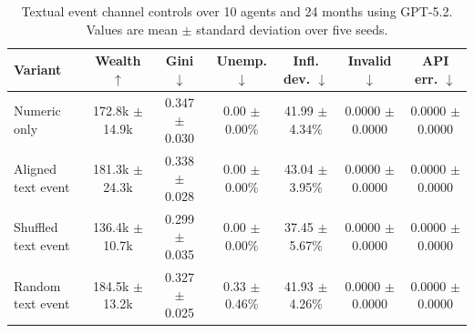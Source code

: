 \ifdefined\FinEvoAllowHistoricalPrePZeroEvidence\else
{}
\fi
\begin{table}[t]
\centering
\small
\setlength{\tabcolsep}{4pt}
\begin{tabular}{lcccccc}
\toprule
Variant & Wealth $\uparrow$ & Gini $\downarrow$ & Unemp. $\downarrow$ & Infl. dev. $\downarrow$ & Invalid $\downarrow$ & API err. $\downarrow$ \\
\midrule
Numeric only & 172.8k $\pm$ 14.9k & 0.347 $\pm$ 0.030 & 0.00 $\pm$ 0.00\% & 41.99 $\pm$ 4.34\% & 0.0000 $\pm$ 0.0000 & 0.0000 $\pm$ 0.0000 \\
Aligned text event & 181.3k $\pm$ 24.3k & 0.338 $\pm$ 0.028 & 0.00 $\pm$ 0.00\% & 43.04 $\pm$ 3.95\% & 0.0000 $\pm$ 0.0000 & 0.0000 $\pm$ 0.0000 \\
Shuffled text event & 136.4k $\pm$ 10.7k & 0.299 $\pm$ 0.035 & 0.00 $\pm$ 0.00\% & 37.45 $\pm$ 5.67\% & 0.0000 $\pm$ 0.0000 & 0.0000 $\pm$ 0.0000 \\
Random text event & 184.5k $\pm$ 13.2k & 0.327 $\pm$ 0.025 & 0.33 $\pm$ 0.46\% & 41.93 $\pm$ 4.26\% & 0.0000 $\pm$ 0.0000 & 0.0000 $\pm$ 0.0000 \\
\bottomrule
\end{tabular}
\caption{Textual event channel controls over 10 agents and 24 months using GPT-5.2. Values are mean $\pm$ standard deviation over five seeds.}
\label{tab:text_event_controls}
\end{table}
